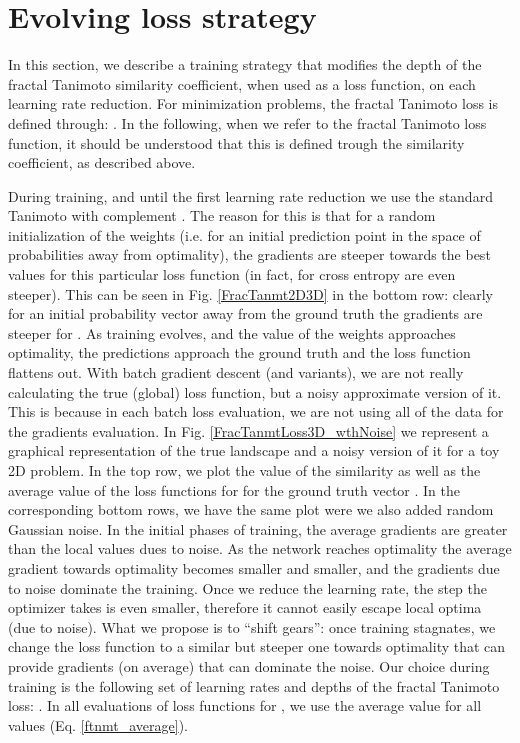 \documentclass[times, 5p]{elsarticle}
\begin{document}
\section{Evolving loss strategy}
\label{section_loss}

In this section, we describe a training strategy that modifies the depth of the fractal Tanimoto similarity coefficient, when used as a loss function, on each learning rate reduction. For minimization problems, the fractal Tanimoto loss is defined through:   
. In the following, when we refer to the fractal Tanimoto loss function, it should be understood that this is defined trough the similarity coefficient, as described above. 

During training, and until the first learning rate reduction we use the standard Tanimoto with complement 
. The reason for this is that for a random initialization of the weights (i.e. for an initial prediction point in the space of probabilities away from optimality), the gradients are steeper towards the best values for this particular loss function (in fact, for cross entropy are even steeper). This can be seen in Fig. \ref{FracTanmt2D3D} in the bottom row: clearly for an initial probability vector  away from the ground truth  the gradients are steeper for . As training evolves, and the value of the weights approaches optimality, the predictions approach the ground truth and the loss function flattens out. With batch gradient descent (and variants), we are not really calculating the true (global) loss function, but a noisy approximate version of it. This is because in each batch loss evaluation, we are not using all of the data for the gradients evaluation. 
In Fig. \ref{FracTanmtLoss3D_wthNoise} we represent a graphical representation of the true landscape and a noisy version of it for a toy 2D problem.  In the top row, we plot the value of the  similarity as well as the average value of the loss functions for  for the ground truth vector . In the corresponding bottom rows, we have the same plot were  we also added random Gaussian noise. In the initial phases of training, the average gradients are greater than the local values dues to noise. As the network reaches optimality the average gradient towards optimality becomes smaller and smaller, and the gradients due to noise dominate the training. Once we reduce the learning rate, the step the optimizer takes is even smaller, therefore it cannot easily escape local optima (due to noise). What we propose is to ``shift gears'': once training stagnates, we change the loss function to a similar but steeper one towards optimality that can provide gradients (on average) that can dominate the noise.  Our choice during training is the following set of learning rates and depths of the fractal Tanimoto loss: 
. In all evaluations of loss functions for , we use the average value for all  values (Eq.  \ref{ftnmt_average}). 
\end{document}
